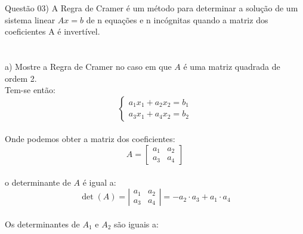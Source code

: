 
\noindent \textcolor{COLOR1}{Questão 03)} A Regra de Cramer é um método para determinar a solução de um sistema linear
$Ax = b$ de n equações e n incógnitas quando a matriz dos coeficientes A é invertível.
\\

\noindent{}
\\
\\

a) Mostre a Regra de Cramer no caso em que $A$ é uma matriz quadrada de ordem 2.
\\

Tem-se então:
\\


\[
    \begin{cases}
        a_1x_1 +a_2x_2  =  b_1 \\
        a_3x_1  +a_4x_2  =  b_2
    \end{cases}
\]
\\

Onde podemos obter a matriz dos coeficientes:
\[
    A=
    \begin{bmatrix}
        a_1 & a_2 \\
        a_3 & a_4
    \end{bmatrix}
\]
\\

o determinante de $A$ é igual a:
\\

\[
    \det(A) =
    \left|\begin{matrix}
        a_1 & a_2 \\
        a_3 & a_4
    \end{matrix}\right|
    =-a_2\cdot a_3+a_1\cdot a_4
\]
\\

Os determinantes de $A_1$ e $A_2$ são iguais a:
\\

